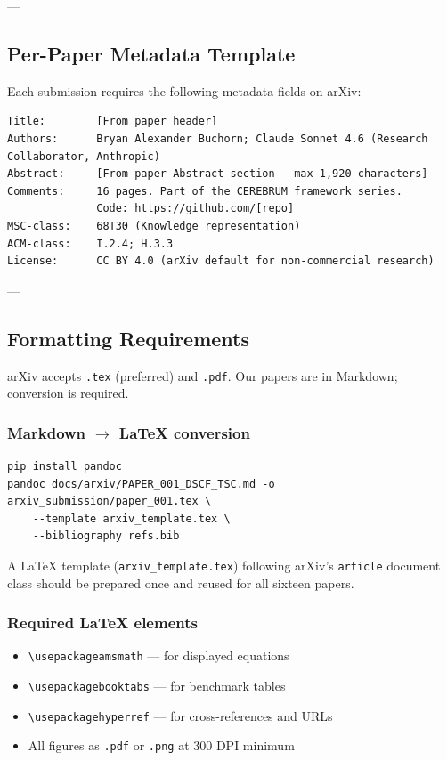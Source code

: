 \documentclass[10pt,journal,compsoc]{IEEEtran}
\begin{document}
---

\subsection{Per-Paper Metadata Template}

Each submission requires the following metadata fields on arXiv:

\begin{lstlisting}
Title:        [From paper header]
Authors:      Bryan Alexander Buchorn; Claude Sonnet 4.6 (Research Collaborator, Anthropic)
Abstract:     [From paper Abstract section — max 1,920 characters]
Comments:     16 pages. Part of the CEREBRUM framework series.
              Code: https://github.com/[repo]
MSC-class:    68T30 (Knowledge representation)
ACM-class:    I.2.4; H.3.3
License:      CC BY 4.0 (arXiv default for non-commercial research)
\end{lstlisting}

---

\subsection{Formatting Requir\-ements}

arXiv accepts \texttt{.tex} (preferred) and \texttt{.pdf}. Our papers are in Markdown; conversion is required.

\subsubsection{Markdown $\to$ LaTeX conversion}

\begin{lstlisting}
pip install pandoc
pandoc docs/arxiv/PAPER_001_DSCF_TSC.md -o arxiv_submission/paper_001.tex \
    --template arxiv_template.tex \
    --bibliography refs.bib
\end{lstlisting}

A LaTeX template (\texttt{arxiv\_template.tex}) following arXiv's \texttt{article} document class should be prepared once and reused for all sixteen papers.

\subsubsection{Required LaTeX elements}
\begin{itemize}
\item \texttt{\textbackslash usepackage{amsmath}} — for displayed equations
\item \texttt{\textbackslash usepackage{booktabs}} — for benchmark tables
\item \texttt{\textbackslash usepackage{hyperref}} — for cross-references and URLs
\item All figures as \texttt{.pdf} or \texttt{.png} at 300 DPI minimum

\end{itemize}
\end{document}
